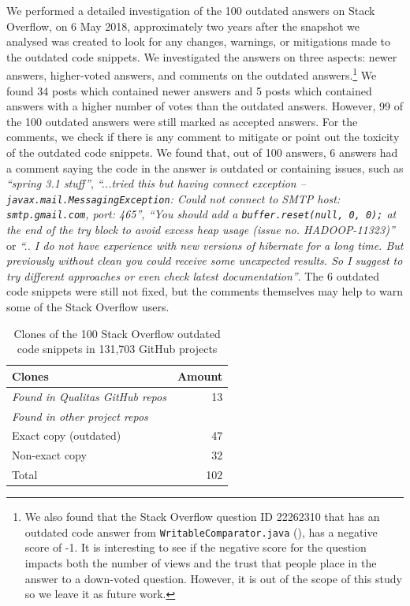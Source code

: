 \documentclass[10pt,journal,compsoc]{IEEEtran}
\begin{document}
We performed a detailed investigation of the 100 outdated answers on Stack
Overflow, on 6 May 2018, approximately two years after the snapshot we analysed was created
to look for any changes, warnings, or mitigations made to the outdated code snippets.
We investigated the answers on three aspects: newer answers, higher-voted answers, and comments on the
outdated answers.\footnote{We also found that the Stack Overflow question ID 22262310 that has an outdated code answer from \texttt{WritableComparator.java} (), has a negative score of -1. It is interesting to see if the negative score for the question impacts both the number of views and the trust that people place in the answer to a down-voted question. However, it is out of the scope of this study so we leave it as future work.} We found
34 posts which contained newer answers and 5 posts which contained answers with a higher number of
votes than the outdated answers. However, 99 of the 100 outdated answers were still
marked as accepted answers. For the comments, we check if there is any comment
to mitigate or point out the toxicity of the outdated code snippets. We found
that, out of 100 answers, 6 answers had a comment saying the
code in the answer is outdated or containing issues, such as \textit{``spring
	3.1 stuff''}, \textit{``...tried this but having connect exception --
	\texttt{javax.mail.MessagingException}:\textit{ Could not connect to SMTP host:
	\texttt{smtp.gmail.com}, port: 465''}, ``You should add a \texttt{buffer.reset(null, 0, 0);} at the end of the try block to avoid excess heap usage (issue no. HADOOP-11323)''} or \textit{``.. I do not have experience
	with new versions of hibernate for a long time. But previously without clean you
	could receive some unexpected results. So I suggest to try different approaches
	or even check latest documentation''}. The 6 outdated code snippets were still
not fixed, but the comments themselves may help to warn some of the Stack Overflow
users.

\begin{table}
\centering
\label{tab:outdated_github}
\begin{tabular}{lr}
	\toprule
	Clones & Amount \\
	\midrule
	\textit{Found in Qualitas GitHub repos} & 13 \\
	\midrule
	\textit{Found in other project repos} & \\
	Exact copy (outdated) & 47 \\
	Non-exact copy & 32 \\
	\midrule
	Total & 102 \\
	\bottomrule
\end{tabular}
	\caption{Clones of the 100 Stack Overflow outdated code snippets in 131,703 GitHub projects}
\end{table}
\end{document}
